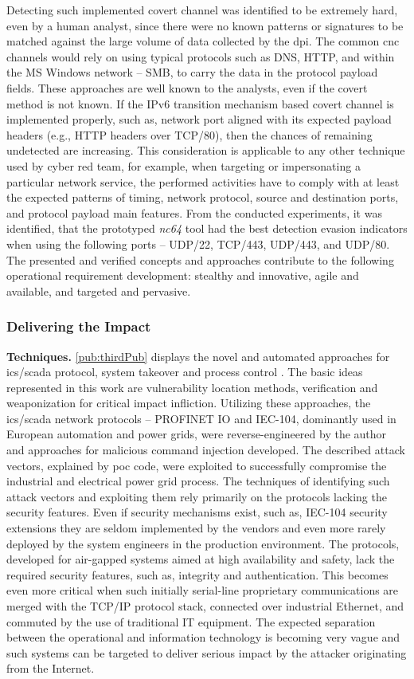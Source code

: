 Detecting such implemented covert channel was identified to be extremely hard, even by a human analyst, since there were no known patterns or signatures to be matched against the large volume of data collected by the \gls{dpi}. The common \gls{cnc} channels would rely on using typical protocols such as DNS, HTTP, and within the MS Windows network -- SMB, to carry the data in the protocol payload fields. These approaches are well known to the analysts, even if the covert method is not known. If the IPv6 transition mechanism based covert channel is implemented properly, such as, network port aligned with its expected payload headers (e.g., HTTP headers over TCP/80), then the chances of remaining undetected are increasing. This consideration is applicable to any other technique used by cyber red team, for example, when targeting or impersonating a particular network service, the performed activities have to comply with at least the expected patterns of timing, network protocol, source and destination ports, and protocol payload main features.
From the conducted experiments, it was identified, that the prototyped \textit{nc64} tool had the best detection evasion indicators when using the following ports -- UDP/22, TCP/443, UDP/443, and UDP/80.
The presented and verified concepts and approaches contribute to the following operational requirement development: stealthy and innovative, agile and available, and targeted and pervasive. 


\subsubsection{Delivering the Impact}
\label{sec:impact}
\textbf{Techniques.}
\ref{pub:thirdPub} displays the novel and automated approaches for \gls{ics}/\gls{scada} protocol, system takeover and process control \cite{Blumbergs2018}.
The basic ideas represented in this work are vulnerability location methods, verification and weaponization for critical impact infliction.
Utilizing these approaches, the \gls{ics}/\gls{scada} network protocols -- PROFINET IO and IEC-104, dominantly used in European automation and power grids, were reverse-engineered by the author and approaches for malicious command injection developed. The described attack vectors, explained by \gls{poc} code, were exploited to successfully compromise the industrial and electrical power grid process. The techniques of identifying such attack vectors and exploiting them rely primarily on the protocols lacking the security features. Even if security mechanisms exist, such as, IEC-104 security extensions they are seldom implemented by the vendors and even more rarely deployed by the system engineers in the production environment. The protocols, developed for air-gapped systems aimed at high availability and safety, lack the required security features, such as, integrity and authentication. This becomes even more critical when such initially serial-line proprietary communications are merged with the TCP/IP protocol stack, connected over industrial Ethernet, and commuted by the use of traditional IT equipment. The expected separation between the operational and information technology is becoming very vague and such systems can be targeted to deliver serious impact by the attacker originating from the Internet.

